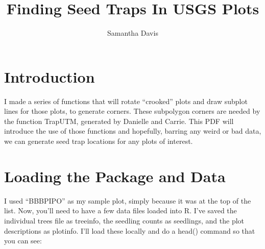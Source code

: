 \documentclass{article}
\begin{document}


\title{Finding Seed Traps In USGS Plots}
\author{Samantha Davis}

\maketitle

\section{Introduction}
I made a series of functions that will rotate ``crooked'' plots and draw subplot lines for those plots, to generate corners. These subpolygon corners are needed by the function TrapUTM, generated by Danielle and Carrie. This PDF will introduce the use of those functions and hopefully, barring any weird or bad data, we can generate seed trap locations for any plots of interest.

\section{Loading the Package and Data}
I used ``BBBPIPO'' as my sample plot, simply because it was at the top of the list. Now, you'll need to have a few data files loaded into R. I've saved the individual trees file as treeinfo, the seedling counts as seedlings, and the plot descriptions as plotinfo. I'll load these locally and do a head() command so that you can see:
\end{document}
